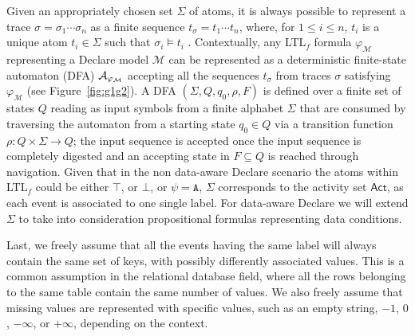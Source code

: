 

Given an appropriately chosen set $\Sigma$ of atoms, it is always possible to represent a trace $\sigma=\sigma_1\cdots \sigma_n$ as a finite sequence $t_\sigma=t_1\cdots t_n$, where, for $1\leq i\leq n$, $t_i$ is a unique atom $t_i\in\Sigma$ such that $\sigma_i\vDash t_i$ \cite{XuLZ17a}.
Contextually,  any LTL$_f$ formula $\varphi_{\mathcal{M}}$ representing a Declare model $\mathcal{M}$ can be represented as a deterministic finite-state automaton (DFA) $\mathcal{A}_{\varphi_{\tiny\mathcal{M}}}$ \cite{Westergaard11} accepting all the sequences $t_\sigma$ from traces $\sigma$ satisfying $\varphi_{\mathcal{M}}$ (see Figure~\ref{fig:g1g2}). A DFA  $(\Sigma,Q,q_0,\rho,F)$ is defined \cite{0016921} over a finite set of states $Q$ reading as input symbols from a finite alphabet $\Sigma$ that are consumed by traversing the automaton from a starting state $q_0\in Q$ via a transition function $\rho\colon Q\times \Sigma\to Q$; the input sequence is accepted once the input sequence is completely digested and an accepting state in $F\subseteq Q$ is reached through navigation. Given that in the non data-aware Declare scenario the atoms within LTL$_f$ could be either $\top$, or $\bot$, or $\psi=\texttt{A}$, $\Sigma$ corresponds to the activity set  $\textsf{Act}$, as each event is associated to one single label. For data-aware Declare we will extend $\Sigma$ to take into consideration propositional formulas representing data conditions.

Last, we freely assume that all the events having the same label will always contain the same set of keys, with possibly differently associated values. This is a common assumption in the relational database field, where all the rows belonging to the same table contain the same number of values. We also freely assume that missing values are represented with specific values, such as an empty string, $-1$, $0$, $-\infty$, or $+\infty$, depending on the context. 